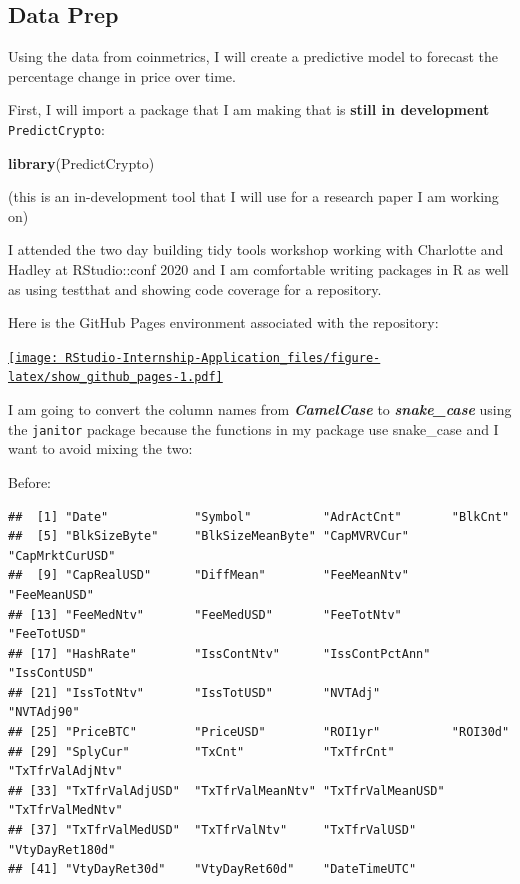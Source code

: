 \documentclass[
]{book}
\newenvironment{Shaded}{\begin{snugshade}}{\end{snugshade}}
\newcommand{\KeywordTok}[1]{\textcolor[rgb]{0.13,0.29,0.53}{\textbf{#1}}}
\newcommand{\NormalTok}[1]{#1}
\begin{document}
\hypertarget{data-prep}{%
\subsection{Data Prep}\label{data-prep}}

Using the data from coinmetrics, I will create a predictive model to forecast the percentage change in price over time.

First, I will import a package that I am making that is \textbf{still in development} \texttt{PredictCrypto}:

\begin{Shaded}
\begin{Highlighting}[]
\KeywordTok{library}\NormalTok{(PredictCrypto)}
\end{Highlighting}
\end{Shaded}

(this is an in-development tool that I will use for a research paper I am working on)

I attended the two day building tidy tools workshop working with Charlotte and Hadley at RStudio::conf 2020 and I am comfortable writing packages in R as well as using testthat and showing code coverage for a repository.

Here is the GitHub Pages environment associated with the repository:

\href{https://ries9112.github.io/PredictCrypto/}{\texttt{[image: RStudio-Internship-Application\_files/figure-latex/show\_github\_pages-1.pdf]}}

I am going to convert the column names from \textbf{\emph{CamelCase}} to \textbf{\emph{snake\_case}} using the \texttt{janitor}\citep{R-janitor} package because the functions in my package use snake\_case and I want to avoid mixing the two:

Before:

\begin{verbatim}
##  [1] "Date"            "Symbol"          "AdrActCnt"       "BlkCnt"         
##  [5] "BlkSizeByte"     "BlkSizeMeanByte" "CapMVRVCur"      "CapMrktCurUSD"  
##  [9] "CapRealUSD"      "DiffMean"        "FeeMeanNtv"      "FeeMeanUSD"     
## [13] "FeeMedNtv"       "FeeMedUSD"       "FeeTotNtv"       "FeeTotUSD"      
## [17] "HashRate"        "IssContNtv"      "IssContPctAnn"   "IssContUSD"     
## [21] "IssTotNtv"       "IssTotUSD"       "NVTAdj"          "NVTAdj90"       
## [25] "PriceBTC"        "PriceUSD"        "ROI1yr"          "ROI30d"         
## [29] "SplyCur"         "TxCnt"           "TxTfrCnt"        "TxTfrValAdjNtv" 
## [33] "TxTfrValAdjUSD"  "TxTfrValMeanNtv" "TxTfrValMeanUSD" "TxTfrValMedNtv" 
## [37] "TxTfrValMedUSD"  "TxTfrValNtv"     "TxTfrValUSD"     "VtyDayRet180d"  
## [41] "VtyDayRet30d"    "VtyDayRet60d"    "DateTimeUTC"
\end{verbatim}
\end{document}
